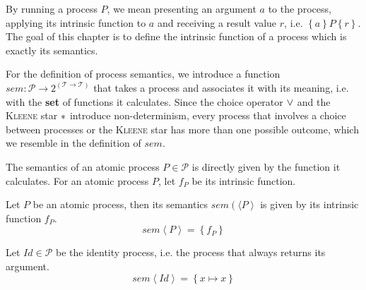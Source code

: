 By running a process $P$, we mean presenting an argument $a$ to the process, applying its intrinsic function to $a$ and receiving a result value $r$, i.e. $\left\{ a \right\} P \left\{ r \right\}$. The goal of this chapter is to define the intrinsic function of a process which is exactly its semantics.

For the definition of process semantics, we introduce a function $sem \colon \mathcal{P} \to 2^{\left( \mathcal{T} \to \mathcal{T} \right)}$ that takes a process and associates it with its meaning, i.e. with the \textbf{set} of functions it calculates. Since the choice operator $\vee$ and the \textsc{Kleene} star $*$ introduce non-determinism, every process that involves a choice between processes or the \textsc{Kleene} star has more than one possible outcome, which we resemble in the definition of $sem$.



The semantics of an atomic process $P \in \mathcal{P}$ is directly given by the function it calculates. For an atomic process $P$, let $f_P$ be its intrinsic function.
\begin{definition}
  \label{def:sem_atomic}
  Let $P$ be an atomic process, then its semantics $sem \left(\langle P \right\rangle$ is given by its intrinsic function $f_P$.
  \begin{equation}
    \label{eqn:sem_atomic}
    sem \left\langle P \right\rangle = \left\{ f_P \right\}
  \end{equation}
  \hfill\qedsymbol
\end{definition}



\begin{definition}
\label{def:sem_id}
Let $Id \in \mathcal{P}$ be the identity process, i.e. the process that always returns its argument.
\begin{equation}
  \label{eqn:sem_id}
  sem \left\langle Id \right\rangle = \left\{ x \mapsto x \right\}
\end{equation}
\hfill\qedsymbol
\end{definition}


